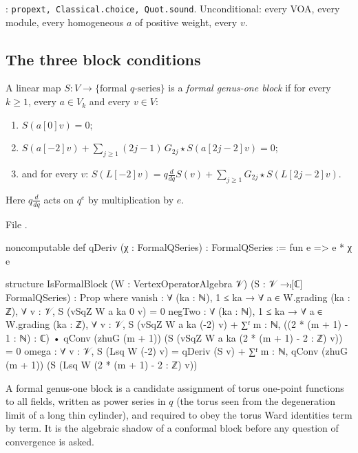 \begin{status}
: \texttt{propext, Classical.choice, Quot.sound}. Unconditional: every VOA, every
module, every homogeneous $a$ of positive weight, every $v$.
\end{status}

\subsection{The three block conditions}

\begin{definition}\label{l15:def:formalblock}
A linear map $S:V\to\{\text{formal }q\text{-series}\}$ is a \emph{formal genus-one block} if for every $k\ge1$, every
$a\in V_k$ and every $v\in V$:
\begin{enumerate}
\item[(i)] $S(a[0]v)=0$;
\item[(ii)] $S(a[-2]v)+\sum_{j\ge1}(2j-1)\,G_{2j}\star S(a[2j-2]v)=0$;
\item[(iii)] and for every $v$: $S(L[-2]v)=q\frac{d}{dq}S(v)+\sum_{j\ge1}G_{2j}\star S(L[2j-2]v)$.
\end{enumerate}
Here $q\frac d{dq}$ acts on $q^e$ by multiplication by $e$.
\end{definition}
\noindent File .
\begin{leancode}
noncomputable def qDeriv (χ : FormalQSeries) : FormalQSeries := fun e => e * χ e

structure IsFormalBlock (W : VertexOperatorAlgebra 𝒱) (S : 𝒱 →ₗ[ℂ] FormalQSeries) : Prop where
  vanish : ∀ (ka : ℕ), 1 ≤ ka → ∀ a ∈ W.grading (ka : ℤ), ∀ v : 𝒱, S (vSqZ W a ka 0 v) = 0
  negTwo : ∀ (ka : ℕ), 1 ≤ ka → ∀ a ∈ W.grading (ka : ℤ), ∀ v : 𝒱,
    S (vSqZ W a ka (-2) v)
      + ∑ᶠ m : ℕ, ((2 * (m + 1) - 1 : ℕ) : ℂ)
          • qConv (zhuG (m + 1)) (S (vSqZ W a ka (2 * (m + 1) - 2 : ℤ) v)) = 0
  omega : ∀ v : 𝒱, S (Lsq W (-2) v)
    = qDeriv (S v) + ∑ᶠ m : ℕ, qConv (zhuG (m + 1)) (S (Lsq W (2 * (m + 1) - 2 : ℤ) v))
\end{leancode}

\begin{physics}
A formal genus-one block is a candidate assignment of torus one-point functions to all fields, written as power series in
$q$ (the torus seen from the degeneration limit of a long thin cylinder), and required to obey the torus Ward identities
term by term. It is the algebraic shadow of a conformal block before any question of convergence is asked.
\end{physics}

